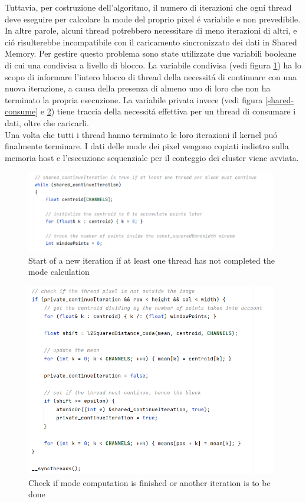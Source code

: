 \documentclass{article}
\begin{document}
\noindent Tuttavia, per costruzione dell'algoritmo, il numero di iterazioni che ogni thread deve eseguire per calcolare la mode del proprio pixel \'e variabile e non prevedibile. In altre parole, alcuni thread potrebbero necessitare di meno iterazioni di altri, e ci\'o risulterebbe incompatibile con il caricamento sincronizzato dei dati in Shared Memory. Per gestire questo problema sono state utilizzate due variabili booleane di cui una condivisa a livello di blocco. La variabile condivisa (vedi figura \ref{shared-variable}) ha lo scopo di informare l'intero blocco di thread della necessit\'a di continuare con una nuova iterazione, a causa della presenza di almeno uno di loro che non ha terminato la propria esecuzione. La variabile privata invece (vedi figura \ref{shared-consume} e \ref{iteration-end}) tiene traccia della necessit\'a effettiva per un thread di consumare i dati, oltre che caricarli.\\ Una volta che tutti i thread hanno terminato le loro iterazioni il kernel pu\'o finalmente terminare. I dati delle mode dei pixel vengono copiati indietro sulla memoria host e l'esecuzione sequenziale per il conteggio dei cluster viene avviata.

\vspace{30px}

\begin{figure}[!h]
\centering
\includegraphics[width= 11cm]{"Immagini/shared-variable.PNG"}
\caption{Start of a new iteration if at least one thread has not completed the mode calculation}
\label{shared-variable}
\end{figure}

\newpage

\vspace{30px}

\begin{figure}[!h]
\centering
\includegraphics[width= 11cm]{"Immagini/iteration-end.PNG"}
\caption{Check if mode computation is finished or another iteration is to be done}
\label{iteration-end}
\end{figure}
\end{document}
